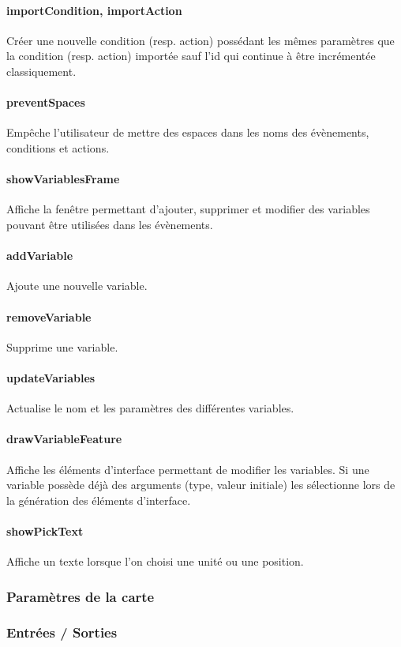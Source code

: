 \documentclass[a4paper]{article}
\begin{document}
\paragraph{importCondition, importAction} Créer une nouvelle condition (resp. action) possédant les mêmes paramètres que la condition (resp. action) importée sauf l'id qui continue à être incrémentée classiquement.
\paragraph{preventSpaces} Empêche l'utilisateur de mettre des espaces dans les noms des évènements, conditions et actions.
\paragraph{showVariablesFrame} Affiche la fenêtre permettant d'ajouter, supprimer et modifier des variables pouvant être utilisées dans les évènements.
\paragraph{addVariable} Ajoute une nouvelle variable.
\paragraph{removeVariable} Supprime une variable.
\paragraph{updateVariables} Actualise le nom et les paramètres des différentes variables.
\paragraph{drawVariableFeature} Affiche les éléments d'interface permettant de modifier les variables. Si une variable possède déjà des arguments (type, valeur initiale) les sélectionne lors de la génération des éléments d'interface.
\paragraph{showPickText} Affiche un texte lorsque l'on choisi une unité ou une position.
\subsubsection{Paramètres de la carte}
\subsubsection{Entrées / Sorties}
\end{document}
